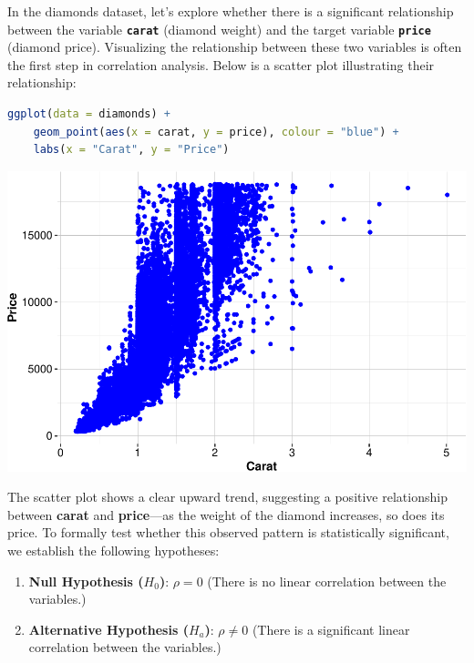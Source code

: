 \documentclass[
]{book}
\newcommand{\passthrough}[1]{#1}
\providecommand{\tightlist}{%
  \setlength{\itemsep}{0pt}\setlength{\parskip}{0pt}}
\theoremstyle{definition}
\theoremstyle{definition}
\theoremstyle{definition}
\theoremstyle{definition}
\theoremstyle{remark}
\begin{document}
In the diamonds dataset, let's explore whether there is a significant relationship between the variable \textbf{\passthrough{\lstinline!carat!}} (diamond weight) and the target variable \textbf{\passthrough{\lstinline!price!}} (diamond price). Visualizing the relationship between these two variables is often the first step in correlation analysis. Below is a scatter plot illustrating their relationship:

\begin{lstlisting}[language=R]
ggplot(data = diamonds) +
    geom_point(aes(x = carat, y = price), colour = "blue") +
    labs(x = "Carat", y = "Price") 
\end{lstlisting}

\begin{center}\includegraphics{statistics_files/figure-latex/unnamed-chunk-19-1} \end{center}

The scatter plot shows a clear upward trend, suggesting a positive relationship between \textbf{carat} and \textbf{price}---as the weight of the diamond increases, so does its price. To formally test whether this observed pattern is statistically significant, we establish the following hypotheses:

\begin{enumerate}
\def\labelenumi{\arabic{enumi}.}
\tightlist
\item
  \textbf{Null Hypothesis (\(H_0\))}: \(\rho = 0\) (There is no linear correlation between the variables.)
\item
  \textbf{Alternative Hypothesis (\(H_a\))}: \(\rho \neq 0\) (There is a significant linear correlation between the variables.)
\end{enumerate}
\end{document}
